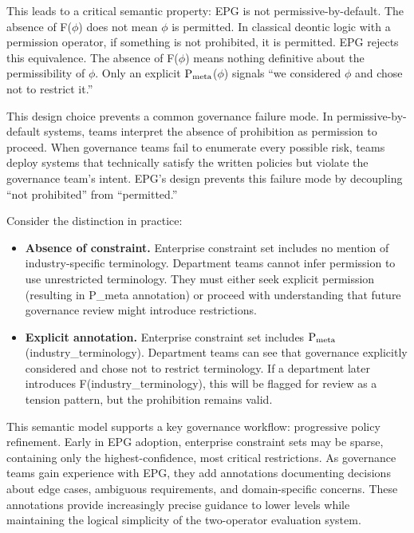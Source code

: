This leads to a critical semantic property: EPG is not permissive-by-default. The absence of F($\phi$) does not mean $\phi$ is permitted. In classical deontic logic with a permission operator, if something is not prohibited, it is permitted. EPG rejects this equivalence. The absence of F($\phi$) means nothing definitive about the permissibility of $\phi$. Only an explicit $\mathrm{P_{meta}}$($\phi$) signals ``we considered $\phi$ and chose not to restrict it.''

This design choice prevents a common governance failure mode. In permissive-by-default systems, teams interpret the absence of prohibition as permission to proceed. When governance teams fail to enumerate every possible risk, teams deploy systems that technically satisfy the written policies but violate the governance team's intent. EPG's design prevents this failure mode by decoupling ``not prohibited'' from ``permitted.''

Consider the distinction in practice:

\begin{itemize}
  \item \textbf{Absence of constraint.} Enterprise constraint set includes no mention of industry-specific terminology. Department teams cannot infer permission to use unrestricted terminology. They must either seek explicit permission (resulting in P\_\allowbreak{}meta annotation) or proceed with understanding that future governance review might introduce restrictions.
\end{itemize}


\begin{itemize}
  \item \textbf{Explicit annotation.} Enterprise constraint set includes $\mathrm{P_{meta}}$(industry\_\allowbreak{}terminology). Department teams can see that governance explicitly considered and chose not to restrict terminology. If a department later introduces F(industry\_\allowbreak{}terminology), this will be flagged for review as a tension pattern, but the prohibition remains valid.
\end{itemize}


This semantic model supports a key governance workflow: progressive policy refinement. Early in EPG adoption, enterprise constraint sets may be sparse, containing only the highest-confidence, most critical restrictions. As governance teams gain experience with EPG, they add annotations documenting decisions about edge cases, ambiguous requirements, and domain-specific concerns. These annotations provide increasingly precise guidance to lower levels while maintaining the logical simplicity of the two-operator evaluation system.

